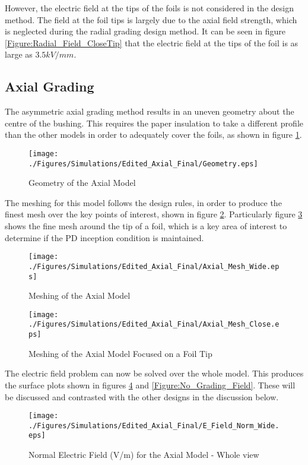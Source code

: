 However, the electric field at the tips of the foils is not considered in the design method.
The field at the foil tips is largely due to the axial field strength, which is neglected during the radial grading design method.
It can be seen in figure \ref{Figure:Radial_Field_CloseTip} that the electric field at the tips of the foil is as large as $3.5kV/mm$.


\subsection{Axial Grading}
The asymmetric axial grading method results in an uneven geometry about the centre of the bushing.
This requires the paper insulation to take a different profile than the other models in order to adequately cover the foils, as shown in figure \ref{Figure:Axial_Geom}.
\begin{figure}[!h]
  \centering
    \texttt{[image: ./Figures/Simulations/Edited\_Axial\_Final/Geometry.eps]} 
	\caption{Geometry of the Axial Model}
	\label{Figure:Axial_Geom}
\end{figure}

The meshing for this model follows the design rules, in order to produce the finest mesh over the key points of interest, shown in figure \ref{Figure:Axial_Mesh_wide}.
Particularly figure \ref{Figure:Axial_Mesh_close} shows the fine mesh around the tip of a foil, which is a key area of interest to determine if the PD inception condition is maintained.
\begin{figure}[!h]
  \centering
    \texttt{[image: ./Figures/Simulations/Edited\_Axial\_Final/Axial\_Mesh\_Wide.eps]} 
	\caption{Meshing of the Axial Model}
	\label{Figure:Axial_Mesh_wide}
\end{figure}

\begin{figure}[!h]
  \centering
    \texttt{[image: ./Figures/Simulations/Edited\_Axial\_Final/Axial\_Mesh\_Close.eps]} 
	\caption{Meshing of the Axial Model Focused on a Foil Tip}
	\label{Figure:Axial_Mesh_close}
\end{figure}

The electric field problem can now be solved over the whole model.
This produces the surface plots shown in figures \ref{Figure:Radial_Field_Wide} and \ref{Figure:No_Grading_Field}.
These will be discussed and contrasted with the other designs in the discussion below.

\begin{figure}[!h]
  \centering
    \texttt{[image: ./Figures/Simulations/Edited\_Axial\_Final/E\_Field\_Norm\_Wide.eps]} 
	\caption{Normal Electric Field (V/m) for the Axial Model - Whole view}
	\label{Figure:Radial_Field_Wide}
   \end{figure}

